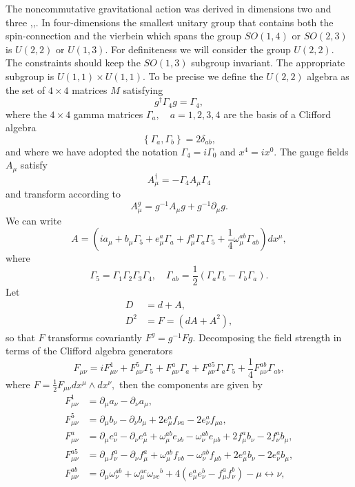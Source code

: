 \documentclass[a4paper,a4paper]{article}
\begin{document}
The noncommutative gravitational action was derived in dimensions two and
three \cite{6authors},\cite{nair},\cite{klemm}. In four-dimensions the
smallest unitary group that contains both the spin-connection and the vierbein
which spans the group $SO(1,4)$ or $SO(2,3)$ is $U(2,2)$ or $U(1,3).$ For
definiteness we will consider the group $U(2,2).$ The constraints should keep
the $SO(1,3)$ subgroup invariant. The appropriate subgroup is $U(1,1)\times
U(1,1).$ To be precise we define the $U(2,2)$ algebra as the set of $4\times4$
matrices $M$ satisfying \cite{physreport}
\[
g^{\dagger}\Gamma_{4}g=\Gamma_{4},
\]
where the $4\times4$ gamma matrices $\Gamma_{a},\quad a=1,2,3,4$ are the basis
of a Clifford algebra
\[
\left\{  \Gamma_{a},\Gamma_{b}\right\}  =2\delta_{ab},
\]
and where we have adopted the notation $\Gamma_{4}=i\Gamma_{0}$ and
$x^{4}=ix^{0}.$ The gauge fields $A_{\mu}$ satisfy
\[
A_{\mu}^{\dagger}=-\Gamma_{4}A_{\mu}\Gamma_{4}%
\]
and transform according to
\[
A_{\mu}^{g}=g^{-1}A_{\mu}g+g^{-1}\partial_{\mu}g.
\]
We can write
\[
A=\left(  ia_{\mu}+b_{\mu}\Gamma_{5}+e_{\mu}^{a}\Gamma_{a}+f_{\mu}^{a}%
\Gamma_{a}\Gamma_{5}+\frac{1}{4}\omega_{\mu}^{ab}\Gamma_{ab}\right)  dx^{\mu},
\]
where
\[
\Gamma_{5}=\Gamma_{1}\Gamma_{2}\Gamma_{3}\Gamma_{4},\quad\Gamma_{ab}=\frac
{1}{2}\left(  \Gamma_{a}\Gamma_{b}-\Gamma_{b}\Gamma_{a}\right)  .
\]
Let
\begin{align*}
D &  =d+A,\\
D^{2} &  =F=(dA+A^{2}),
\end{align*}
so that $F$ transforms covariantly $F^{g}=g^{-1}Fg$. Decomposing the field
strength in terms of the Clifford algebra generators
\[
F_{\mu\nu}=iF_{\mu\nu}^{1}+F_{\mu\nu}^{5}\Gamma_{5}+F_{\mu\nu}^{a}\Gamma
_{a}+F_{\mu\nu}^{a5}\Gamma_{a}\Gamma_{5}+\frac{1}{4}F_{\mu\nu}^{ab}\Gamma
_{ab},
\]
where $F=\frac{1}{2}F_{\mu\nu}dx^{\mu}\wedge dx^{\nu},$ then the components
are given by
\begin{align*}
F_{\mu\nu}^{1} &  =\partial_{\mu}a_{\nu}-\partial_{\nu}a_{\mu},\\
F_{\mu\nu}^{5} &  =\partial_{\mu}b_{\nu}-\partial_{\nu}b_{\mu}+2e_{\mu}%
^{a}f_{\nu a}-2e_{\nu}^{a}f_{\mu a},\\
F_{\mu\nu}^{a} &  =\partial_{\mu}e_{\nu}^{a}-\partial_{\nu}e_{\mu}^{a}%
+\omega_{\mu}^{ab}e_{\nu b}-\omega_{\nu}^{ab}e_{\mu b}+2f_{\mu}^{a}b_{\nu
}-2f_{\nu}^{a}b_{\mu},\\
F_{\mu\nu}^{a5} &  =\partial_{\mu}f_{\nu}^{a}-\partial_{\nu}f_{\mu}^{a}%
+\omega_{\mu}^{ab}f_{\nu b}-\omega_{\nu}^{ab}f_{\mu b}+2e_{\mu}^{a}b_{\nu
}-2e_{\nu}^{a}b_{\mu},\\
F_{\mu\nu}^{ab} &  =\partial_{\mu}\omega_{\nu}^{ab}+\omega_{\mu}^{ac}%
\omega_{\nu c}^{\quad b}+4\left(  e_{\mu}^{a}e_{\nu}^{b}-f_{\mu}^{a}f_{\nu
}^{b}\right)  -\mu\longleftrightarrow\nu,
\end{align*}
\end{document}
